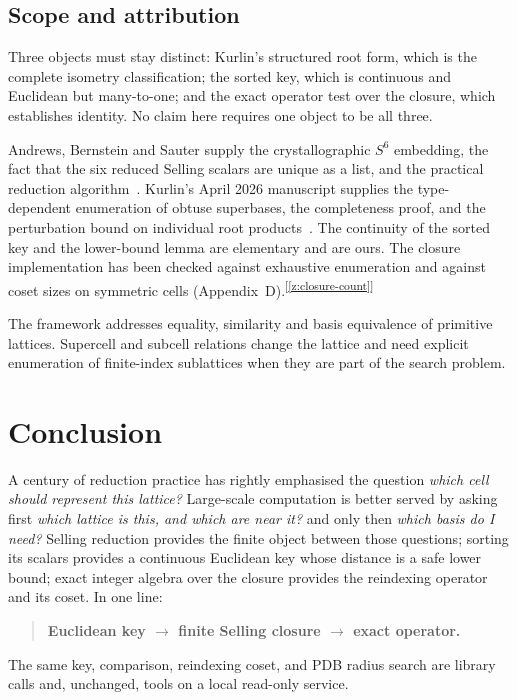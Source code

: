 \documentclass[11pt]{article}
\newcommand{\chk}[1]{\textsuperscript{[\ref{#1}]}}
\begin{document}
\subsection{Scope and attribution}

Three objects must stay distinct: Kurlin's structured root form, which is the complete isometry classification; the sorted key, which is continuous and Euclidean but many-to-one; and the exact operator test over the closure, which establishes identity. No claim here requires one object to be all three.

Andrews, Bernstein and Sauter supply the crystallographic $S^6$ embedding, the fact that the six reduced Selling scalars are unique as a list, and the practical reduction algorithm~\cite{ab1988,abs2019,ab2023}. Kurlin's April 2026 manuscript supplies the type-dependent enumeration of obtuse superbases, the completeness proof, and the perturbation bound on individual root products~\cite{kurlin2026}. The continuity of the sorted key and the lower-bound lemma are elementary and are ours. The closure implementation has been checked against exhaustive enumeration and against coset sizes on symmetric cells (Appendix~D).\chk{z:closure-count}

The framework addresses equality, similarity and basis equivalence of primitive lattices. Supercell and subcell relations change the lattice and need explicit enumeration of finite-index sublattices when they are part of the search problem.

\section{Conclusion}

A century of reduction practice has rightly emphasised the question \emph{which cell should represent this lattice?} Large-scale computation is better served by asking first \emph{which lattice is this, and which are near it?} and only then \emph{which basis do I need?} Selling reduction provides the finite object between those questions; sorting its scalars provides a continuous Euclidean key whose distance is a safe lower bound; exact integer algebra over the closure provides the reindexing operator and its coset. In one line:
\begin{quote}
\textbf{Euclidean key $\rightarrow$ finite Selling closure $\rightarrow$ exact operator.}
\end{quote}
The same key, comparison, reindexing coset, and PDB radius search are library calls and, unchanged, tools on a local read-only service.
\end{document}
